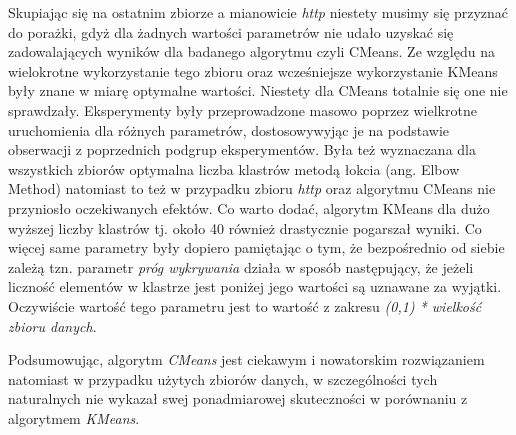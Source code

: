 \documentclass{classrep}
\begin{document}
{        Skupiając się na ostatnim zbiorze a mianowicie \textit{http} niestety musimy
        się przyznać do porażki, gdyż dla żadnych wartości parametrów nie udało uzyskać
        się zadowalających wyników dla badanego algorytmu czyli CMeans. Ze względu na
        wielokrotne wykorzystanie tego zbioru oraz wcześniejsze wykorzystanie KMeans
        były znane w miarę optymalne wartości. Niestety dla CMeans totalnie się one nie
        sprawdzały. Eksperymenty były przeprowadzone masowo poprzez wielkrotne
        uruchomienia dla różnych parametrów, dostosowywyjąc je na podstawie obserwacji
        z poprzednich podgrup eksperymentów. Była też wyznaczana dla wszystkich zbiorów
        optymalna liczba klastrów metodą łokcia (ang. Elbow Method) natomiast to też w
        przypadku zbioru \textit{http} oraz algorytmu CMeans nie przyniosło
        oczekiwanych efektów. Co warto dodać, algorytm KMeans dla dużo wyższej liczby
        klastrów tj. około 40 również drastycznie pogarszał wyniki. Co więcej same
        parametry były dopiero pamiętając o tym, że bezpośrednio od siebie zależą tzn.
        parametr \textit{próg wykrywania} działa w sposób następujący, że jeżeli liczność
        elementów w klastrze jest poniżej jego wartości są uznawane za wyjątki.
        Oczywiście wartość tego parametru jest to wartość z zakresu
        \textit{(0,1) * wielkość zbioru danych}.

        Podsumowując, algorytm \textit{CMeans} jest ciekawym i nowatorskim rozwiązaniem
        natomiast w przypadku użytych zbiorów danych, w szczególności tych naturalnych
        nie wykazał swej ponadmiarowej skuteczności w porównaniu z algorytmem
        \textit{KMeans}.
    }

    \begin{thebibliography}{0}
    \end{thebibliography}
\end{document}
